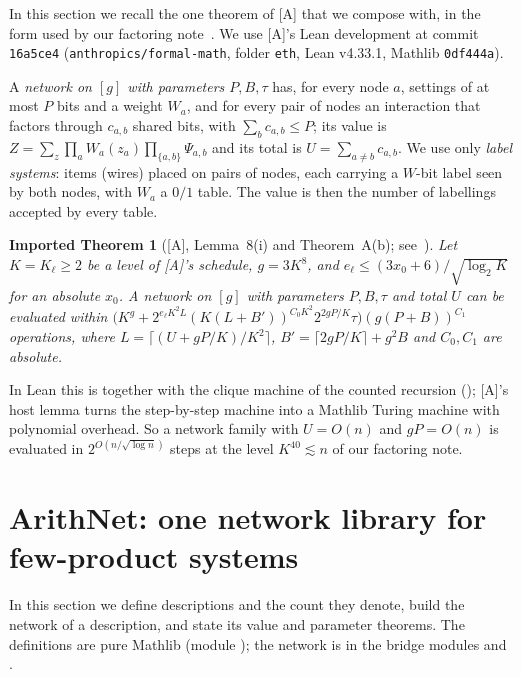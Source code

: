 \documentclass[10pt]{amsart}
\theoremstyle{plain}
\newtheorem{importedtheorem}[theorem]{Imported Theorem}
\theoremstyle{definition}
\theoremstyle{remark}
\numberwithin{equation}{section}
\newcommand{\A}{\textup{[A]}}
\newcommand{\rate}{2^{O(n/\sqrt{\log n})}}
\begin{document}
In this section we recall the one theorem of \A{} that we compose with, in the form used by our
factoring note~\cite[\S2]{TulFac26}. We use \A's Lean development at commit \texttt{16a5ce4}
(\texttt{anthropics/formal-math}, folder \texttt{eth}, Lean v4.33.1, Mathlib \texttt{0df444a}).

A \emph{network on $[g]$ with parameters $P,B,\tau$} has, for every node $a$, settings of at most $P$
bits and a weight $W_a$, and for every pair of nodes an interaction that factors through $c_{a,b}$
shared bits, with $\sum_bc_{a,b}\le P$; its value is $Z=\sum_z\prod_aW_a(z_a)\prod_{\{a,b\}}\Psi_{a,b}$ and
its total is $U=\sum_{a\ne b}c_{a,b}$. We use only \emph{label systems}: items (wires) placed on pairs of
nodes, each carrying a $W$-bit label seen by both nodes, with $W_a$ a $0/1$ table. The value is then the
number of labellings accepted by every table.

\begin{importedtheorem}[\A, Lemma~8(i) and Theorem~A(b); see~{\cite[Imported Thm.~2.2]{TulFac26}}]\label{imp:engine}
Let $K=K_\ell\ge2$ be a level of \A's schedule, $g=3K^8$, and $e_\ell\le(3x_0+6)/\sqrt{\log_2K}$ for an
absolute $x_0$. A network on $[g]$ with parameters $P,B,\tau$ and total $U$ can be evaluated within
$\bigl(K^g+2^{e_\ell K^2L}(K(L+B'))^{C_0K^2}2^{2gP/K}\tau\bigr)(g(P+B))^{C_1}$ operations, where
$L=\lceil(U+gP/K)/K^2\rceil$, $B'=\lceil2gP/K\rceil+g^2B$ and $C_0,C_1$ are absolute.
\end{importedtheorem}

\noindent In Lean this is  together with the clique machine
of the counted recursion (); \A's host lemma  turns the
step-by-step machine into a Mathlib Turing machine with polynomial overhead. So a network family with
$U=O(n)$ and $gP=O(n)$ is evaluated in $\rate$ steps at the level $K^{40}\lesssim n$ of our factoring note.

\section{ArithNet: one network library for few-product systems}\label{sec:arithnet}

In this section we define descriptions and the count they denote, build the network of a description,
and state its value and parameter theorems. The definitions are pure Mathlib (module );
the network is in the bridge modules  and .
\end{document}
